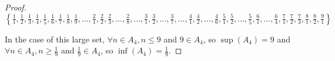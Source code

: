 \documentclass[10pt]{article}
\begin{document}
\begin{enumerate}
\begin{enumerate}
\begin{proof}
$\left\{\frac{1}{1}, \frac{1}{2}, \frac{1}{3},\frac{1}{4},\frac{1}{5},\frac{1}{6},\frac{1}{7},\frac{1}{8},\frac{1}{9},..., \frac{2}{1}, \frac{2}{2},\frac{2}{3},...,\frac{2}{8}, ..., \frac{3}{1},\frac{3}{2},...,\frac{3}{7},..., \frac{4}{1},\frac{4}{2},...,\frac{4}{6},\frac{5}{1},\frac{5}{2},...,\frac{5}{5},\frac{6}{1},...,\frac{6}{4},\frac{7}{1},\frac{7}{2},\frac{7}{3},\frac{8}{1},\frac{8}{2}, \frac{9}{1}\right\}$

In the case of this large set, $\forall n \in A_4, n \leq 9$ and $9 \in A_4$, so $\sup{(A_4)} = 9$ and $\forall n \in A_4, n \geq \frac{1}{9}$ and $\frac{1}{9} \in A_4$, so $\inf{(A_4)} = \frac{1}{9}$.
\end{proof}
	\end{enumerate}
\end{enumerate}
\end{document}
